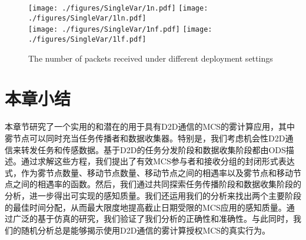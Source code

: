\begin{figure}[!h]
  \centering
	{\texttt{[image: ./figures/SingleVar/1n.pdf]}}
	{\texttt{[image: ./figures/SingleVar/1ln.pdf]}}\\
	{\texttt{[image: ./figures/SingleVar/1nf.pdf]}}
	{\texttt{[image: ./figures/SingleVar/1lf.pdf]}}
	\vspace{-1em}
	\caption{The number of packets received under different deployment settings}
	\label{Figure_SingleValTest}
\end{figure}

\section{本章小结}

本章节研究了一个实用的和潜在的用于具有D2D通信的MCS的雾计算应用，其中雾节点可以同时充当任务传播者和数据收集器。特别是，我们考虑机会性D2D通信来转发任务和传感数据。基于D2D的任务分发阶段和数据收集阶段都由ODS描述。通过求解这些方程，我们提出了有效MCS参与者和接收分组的封闭形式表达式，作为雾节点数量、移动节点数量、移动节点之间的相遇率以及雾节点和移动节点之间的相遇率的函数。然后，我们通过共同探索任务传播阶段和数据收集阶段的分析，进一步得出可实现的感知质量。我们还运用我们的分析来找出两个主要阶段的最佳时间分配，从而最大限度地提高截止日期受限的MCS应用的感知质量。通过广泛的基于仿真的研究，我们验证了我们分析的正确性和准确性。与此同时，我们的随机分析总是能够揭示使用D2D通信的雾计算授权MCS的真实行为。